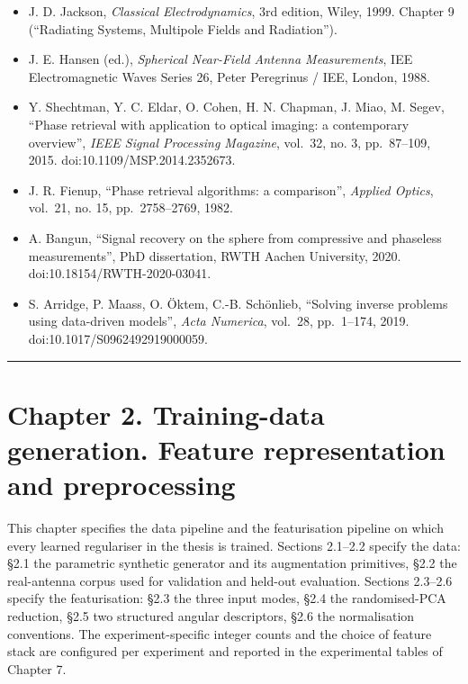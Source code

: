 \documentclass[
  english,
  11pt,
]{report}
\providecommand{\tightlist}{%
  \setlength{\itemsep}{0pt}\setlength{\parskip}{0pt}}
\begin{document}
\begin{itemize}
\tightlist
\item
  J. D. Jackson, \emph{Classical Electrodynamics}, 3rd edition, Wiley,
  1999. Chapter 9 (``Radiating Systems, Multipole Fields and
  Radiation'').
\item
  J. E. Hansen (ed.), \emph{Spherical Near-Field Antenna Measurements},
  IEE Electromagnetic Waves Series 26, Peter Peregrinus / IEE, London,
  1988.
\item
  Y. Shechtman, Y. C. Eldar, O. Cohen, H. N. Chapman, J. Miao, M. Segev,
  ``Phase retrieval with application to optical imaging: a contemporary
  overview'', \emph{IEEE Signal Processing Magazine}, vol.~32, no. 3,
  pp.~87--109, 2015. doi:10.1109/MSP.2014.2352673.
\item
  J. R. Fienup, ``Phase retrieval algorithms: a comparison'',
  \emph{Applied Optics}, vol.~21, no. 15, pp.~2758--2769, 1982.
\item
  A. Bangun, ``Signal recovery on the sphere from compressive and
  phaseless measurements'', PhD dissertation, RWTH Aachen University,
  2020. doi:10.18154/RWTH-2020-03041.
\item
  S. Arridge, P. Maass, O. Öktem, C.-B. Schönlieb, ``Solving inverse
  problems using data-driven models'', \emph{Acta Numerica}, vol.~28,
  pp.~1--174, 2019. doi:10.1017/S0962492919000059.
\end{itemize}

\begin{center}\rule{0.5\linewidth}{0.5pt}\end{center}

\chapter{Chapter 2. Training-data generation. Feature representation and
preprocessing}\label{chapter-2.-training-data-generation.-feature-representation-and-preprocessing}

This chapter specifies the data pipeline and the featurisation pipeline
on which every learned regulariser in the thesis is trained. Sections
2.1--2.2 specify the data: §2.1 the parametric synthetic generator and
its augmentation primitives, §2.2 the real-antenna corpus used for
validation and held-out evaluation. Sections 2.3--2.6 specify the
featurisation: §2.3 the three input modes, §2.4 the randomised-PCA
reduction, §2.5 two structured angular descriptors, §2.6 the
normalisation conventions. The experiment-specific integer counts and
the choice of feature stack are configured per experiment and reported
in the experimental tables of Chapter 7.
\end{document}

